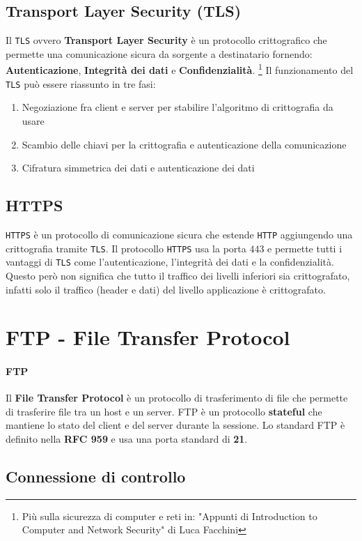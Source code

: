     \subsection{Transport Layer Security (TLS)}
        Il \texttt{TLS} ovvero \textbf{Transport Layer Security} è un protocollo crittografico che permette una comunicazione sicura da sorgente a destinatario fornendo: \textbf{Autenticazione}, \textbf{Integrità dei dati} e \textbf{Confidenzialità}. \footnote{Più sulla sicurezza di computer e reti in: "Appunti di Introduction to Computer and Network Security" di Luca Facchini}\newline
        Il funzionamento del \texttt{TLS} può essere riassunto in tre fasi:
        \begin{enumerate}
            \item Negoziazione fra client e server per stabilire l'algoritmo di crittografia da usare
            \item Scambio delle chiavi per la crittografia e autenticazione della comunicazione
            \item Cifratura simmetrica dei dati e autenticazione dei dati
        \end{enumerate}
    \subsection{HTTPS}
        \texttt{HTTPS} è un protocollo di comunicazione sicura che estende \texttt{HTTP} aggiungendo una crittografia tramite \texttt{TLS}. Il protocollo \texttt{HTTPS} usa la porta $ 443 $ e permette tutti i vantaggi di \texttt{TLS} come l'autenticazione, l'integrità dei dati e la confidenzialità. Questo però non significa che tutto il traffico dei livelli inferiori sia crittografato, infatti solo il traffico (header e dati) del livello applicazione è crittografato.
\section{FTP - File Transfer Protocol}
    \paragraph{FTP} Il \textbf{File Transfer Protocol} è un protocollo di trasferimento di file che permette di trasferire file tra un host e un server. FTP è un protocollo \textbf{stateful} che mantiene lo stato del client e del server durante la sessione. Lo standard FTP è definito nella \textbf{RFC 959} e usa una porta standard di \textbf{21}.
    \subsection{Connessione di controllo}
